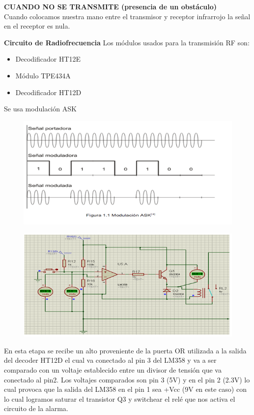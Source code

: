 \documentclass[a4paper,11pt]{article}
\begin{document}
\textbf{CUANDO NO SE TRANSMITE (presencia de un obstáculo)} \\
Cuando colocamos nuestra mano entre el transmisor y receptor infrarrojo la señal en el receptor es nula.

\textbf{Circuito de Radiofrecuencia}
Los módulos usados para la transmisión RF son:
\begin{itemize}
	\item	Decodificador HT12E
	\item 	Módulo TPE434A
	\item 	Decodificador HT12D
\end{itemize}

\newpage
Se usa modulación ASK

\begin{figure}[h]
	\centering
	\includegraphics[width=0.7\linewidth]{./29}
\end{figure}


\begin{figure}[h]
	\centering
	\includegraphics[width=0.7\linewidth]{./30}
\end{figure}

En esta etapa se recibe un alto proveniente de la puerta OR utilizada a la salida del decoder HT12D el cual va conectado al pin 3 del LM358 y va a ser comparado con un voltaje establecido entre un divisor de tensión que va conectado al pin2. Los voltajes comparados son pin 3 (5V) y en el pin 2 (2.3V) lo cual provoca que la salida del LM358 en el pin 1 sea +Vcc (9V en este caso) con lo cual logramos saturar el transistor Q3 y switchear el relé que nos activa el circuito de la alarma.
\end{document}
